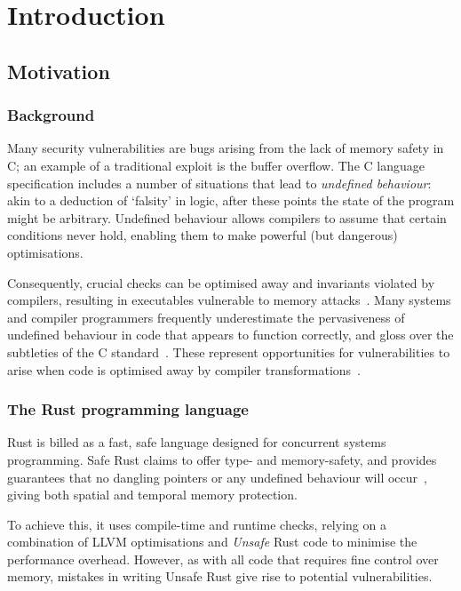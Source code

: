 \documentclass[dissertation.tex]{subfiles}
\begin{document}
\chapter{Introduction}
\label{ch:intro}

\section{Motivation}
\label{sec:intro-motiv}

\subsection{Background}
Many security vulnerabilities are bugs arising from the lack of memory
safety in C; an example of a traditional exploit is the buffer overflow.
The C language specification includes a number of situations that lead
to \emph{undefined behaviour}: akin to a deduction of `falsity' in
logic, after these points the state of the program might be arbitrary.
Undefined behaviour allows compilers to assume that certain conditions
never hold, enabling them to make powerful (but dangerous)
optimisations.

Consequently, crucial checks can be optimised away and invariants
violated by compilers, resulting in executables vulnerable to memory
attacks~\cite{simon2018wygiwyc}.
Many systems and compiler programmers frequently underestimate the
pervasiveness of undefined behaviour in code that appears to function
correctly, and gloss over the subtleties of the C
standard~\cite{memarian2016cdepths}.
These represent opportunities for vulnerabilities to arise when code is
optimised away by compiler transformations~\cite{wang2013towards}.


\subsection{The Rust programming language}

Rust is billed as a fast, safe language designed for concurrent systems
programming.
Safe Rust claims to offer type- and memory-safety, and provides
guarantees that no dangling pointers or any undefined behaviour will
occur~\cite{rust-nomicon-safe-unsafe}, giving both spatial and temporal
memory protection.

To achieve this, it uses compile-time and runtime checks, relying on a
combination of LLVM optimisations and \emph{Unsafe} Rust code to
minimise the performance overhead.
However, as with all code that requires fine control over memory,
mistakes in writing Unsafe Rust give rise to potential vulnerabilities.
\end{document}
